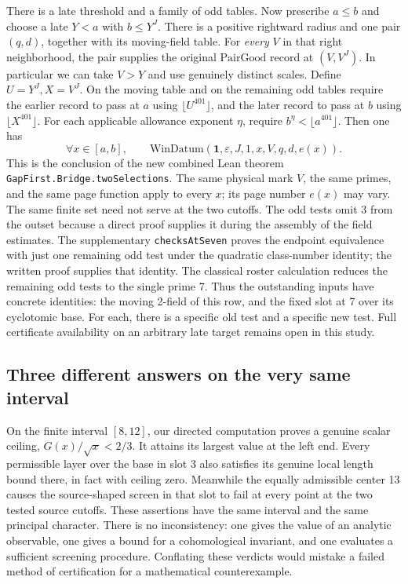 \documentclass[12pt,letterpaper]{article}
\begin{document}
There is a late threshold and a family of odd tables. Now prescribe \(a\le b\) and choose a late \(Y<a\) with \(b\le Y^J\). There is a positive rightward radius and one pair \((q,d)\), together with its moving-field table. For \emph{every} \(V\) in that right neighborhood, the pair supplies the original \(\mathrm{PairGood}\) record at \((V,V^J)\). In particular we can take \(V>Y\) and use genuinely distinct scales. Define \(U=Y^J, X=V^J\). On the moving table and on the remaining odd tables require the earlier record to pass at \(a\) using \(\lfloor U^{401}\rfloor\), and the later record to pass at \(b\) using \(\lfloor X^{401}\rfloor\). For each applicable allowance exponent \(\eta\), require \(b^\eta<\lfloor a^{401}\rfloor\). Then one has
\[
 \forall x\in[a,b],\qquad
 \mathrm{WinDatum}(\mathbf 1,\varepsilon,J,1,x,V,q,d,e(x)).
\]
This is the conclusion of the new combined Lean theorem \texttt{GapFirst.Bridge.twoSelections}. The same physical mark \(V\), the same primes, and the same page function apply to every \(x\); its page number \(e(x)\) may vary. The same finite set need not serve at the two cutoffs. The odd tests omit 3 from the outset because a direct proof supplies it during the assembly of the field estimates. The supplementary \texttt{checksAtSeven} proves the endpoint equivalence with just one remaining odd test under the quadratic class-number identity; the written proof supplies that identity. The classical roster calculation reduces the remaining odd tests to the single prime 7. Thus the outstanding inputs have concrete identities: the moving 2-field of this row, and the fixed slot at 7 over its cyclotomic base. For each, there is a specific old test and a specific new test. Full certificate availability on an arbitrary late target remains open in this study.

\subsection{Three different answers on the very same interval}
On the finite interval \([8,12]\), our directed computation proves a genuine scalar ceiling, \(G(x)/\sqrt x<2/3\). It attains its largest value at the left end. Every permissible layer over the base in slot 3 also satisfies its genuine local length bound there, in fact with ceiling zero. Meanwhile the equally admissible center 13 causes the source-shaped screen in that slot to fail at every point at the two tested source cutoffs. These assertions have the same interval and the same principal character. There is no inconsistency: one gives the value of an analytic observable, one gives a bound for a cohomological invariant, and one evaluates a sufficient screening procedure. Conflating these verdicts would mistake a failed method of certification for a mathematical counterexample.
\end{document}
